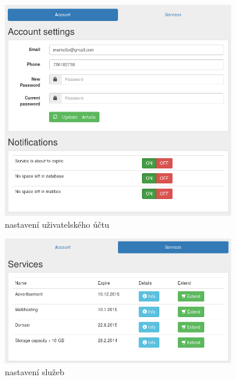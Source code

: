 \documentclass[11pt,a4paper]{article}
\begin{document}
      \begin{figure}[ht]
        \begin{center}
          \includegraphics[width=10cm]{acc}
          \caption{nastavení uživatelského účtu}
          \label{nastaveni-uctu}
        \end{center}
      \end{figure}

      \begin{figure}[ht]
        \begin{center}
          \includegraphics[width=10cm]{srvc}
          \caption{nastavení služeb}
          \label{nastaveni-sluzeb}
        \end{center}
      \end{figure}
\end{document}
